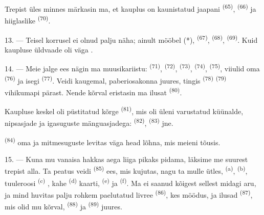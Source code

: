 Trepist üles minnes märkasin ma, et kauplus on kaunistatud jaapani 
\textsuperscript{(65)},  \textsuperscript{(66)} ja hiiglaslike
 \textsuperscript{(70)}.

13. --- Teisel korrusel ei olnud palju näha; ainult mööbel (*), 
\textsuperscript{(67)},  \textsuperscript{(68)}, 
\textsuperscript{(69)}. Kuid kaupluse üldvaade oli väga .

14. --- Meie jalge ees nägin ma muusikariistu:  \textsuperscript{(71)},
 \textsuperscript{(72)},  \textsuperscript{(73)},
 \textsuperscript{(74)}, 
\textsuperscript{(75)}, viiulid oma  \textsuperscript{(76)} ja isegi
 \textsuperscript{(77)}. Veidi kaugemal, paberiosakonna juures, tingis
 \textsuperscript{(78)}  \textsuperscript{(79)}
vihikumapi pärast. Nende kõrval eristasin ma ilusat 
\textsuperscript{(80)}.

Kaupluse keskel oli püstitatud kõrge  \textsuperscript{(81)}, mis oli
üleni varustatud küünalde, nipsasjade ja igasuguste mänguasjadega: 
\textsuperscript{(82)},  \textsuperscript{(83)} jne.

 \textsuperscript{(84)} oma  ja mitmesuguste
 levitas väga head lõhna, mis meieni tõusis.

\VUsaut{3.4mm}
\VUsaut{2.8mm}

15. --- Kuna mu vanaisa hakkas aega liiga pikaks pidama, läksime me suurest trepist
alla. Ta peatus veidi  \textsuperscript{(85)} ees, mis kujutas,
nagu ta mulle ütles,  \textsuperscript{(a)},  \textsuperscript{(b)}, tuuleroosi 
\textsuperscript{(c)} , kahe 
\textsuperscript{(d)} kaarti,  \textsuperscript{(e)} ja
 \textsuperscript{(f)}. Ma ei saanud kõigest sellest midagi aru,
ja mind huvitas palju rohkem paelutatud livree 
\textsuperscript{(86)}, kes möödus, ja ilusad  \textsuperscript{(87)},
mis olid mu kõrval,  \textsuperscript{(88)} ja 
\textsuperscript{(89)} juures.

